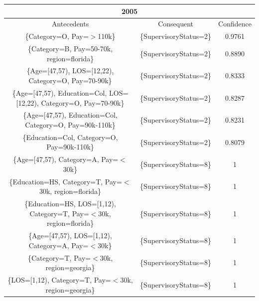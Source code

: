 \documentclass{article}
\begin{document}
    \begin{center}
        \begin{table}
            \centering
            \begin{tabular}{ |c|c|c| }
                \hline
                \multicolumn{3}{|c|}{2005} \\
                \hline
                Antecedents & Consequent & Confidence \\
                \hline
                \{Category=O,
                Pay=$>$110k\} & \{SupervisoryStatus=2\} & 0.9761 \\
                \{Category=B,
                Pay=50-70k,
                region=florida\} & \{SupervisoryStatus=2\} & 0.8890 \\
                \{Age=[47,57),
                LOS=[12,22),
                Category=O,
                Pay=70-90k\} & \{SupervisoryStatus=2\} & 0.8333 \\
                \{Age=[47,57),
                Education=Col,
                LOS=[12,22),
                Category=O,
                Pay=70-90k\} & \{SupervisoryStatus=2\} & 0.8287 \\
                \{Age=[47,57),
                Education=Col,
                Category=O,
                Pay=90k-110k\} & \{SupervisoryStatus=2\} & 0.8231 \\
                \{Education=Col,
                Category=O,
                Pay=90k-110k\} & \{SupervisoryStatus=2\} & 0.8079 \\
                \{Age=[47,57),
                Category=A,
                Pay=$<$30k\} & \{SupervisoryStatus=8\} & 1 \\
                \{Education=HS,
                Category=T,
                Pay=$<$30k,
                region=florida\} & \{SupervisoryStatus=8\} & 1 \\
                \{Education=HS,
                LOS=[1,12),
                Category=T,
                Pay=$<$30k,
                region=florida\} & \{SupervisoryStatus=8\} & 1 \\
                \{Age=[47,57),
                LOS=[1,12),
                Category=A,
                Pay=$<$30k\} & \{SupervisoryStatus=8\} & 1 \\
                \{Category=T,
                Pay=$<$30k,
                region=georgia\} & \{SupervisoryStatus=8\} & 1 \\
                \{LOS=[1,12),
                Category=T,
                Pay=$<$30k,
                region=georgia\} & \{SupervisoryStatus=8\} & 1 \\

\end{tabular}
\end{table}
\end{center}
\end{document}
